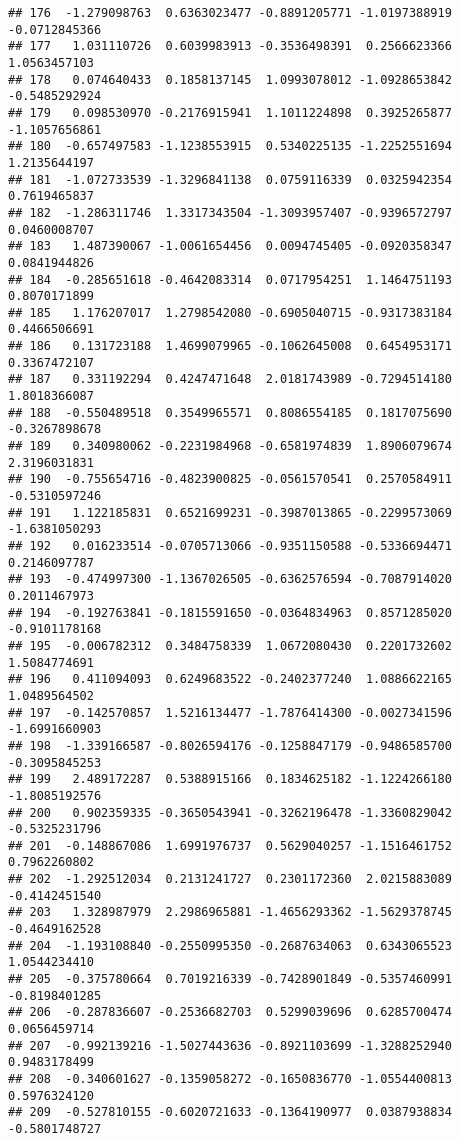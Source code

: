 \documentclass[
]{article}
\begin{document}
\begin{verbatim}
## 176  -1.279098763  0.6363023477 -0.8891205771 -1.0197388919 -0.0712845366
## 177   1.031110726  0.6039983913 -0.3536498391  0.2566623366  1.0563457103
## 178   0.074640433  0.1858137145  1.0993078012 -1.0928653842 -0.5485292924
## 179   0.098530970 -0.2176915941  1.1011224898  0.3925265877 -1.1057656861
## 180  -0.657497583 -1.1238553915  0.5340225135 -1.2252551694  1.2135644197
## 181  -1.072733539 -1.3296841138  0.0759116339  0.0325942354  0.7619465837
## 182  -1.286311746  1.3317343504 -1.3093957407 -0.9396572797  0.0460008707
## 183   1.487390067 -1.0061654456  0.0094745405 -0.0920358347  0.0841944826
## 184  -0.285651618 -0.4642083314  0.0717954251  1.1464751193  0.8070171899
## 185   1.176207017  1.2798542080 -0.6905040715 -0.9317383184  0.4466506691
## 186   0.131723188  1.4699079965 -0.1062645008  0.6454953171  0.3367472107
## 187   0.331192294  0.4247471648  2.0181743989 -0.7294514180  1.8018366087
## 188  -0.550489518  0.3549965571  0.8086554185  0.1817075690 -0.3267898678
## 189   0.340980062 -0.2231984968 -0.6581974839  1.8906079674  2.3196031831
## 190  -0.755654716 -0.4823900825 -0.0561570541  0.2570584911 -0.5310597246
## 191   1.122185831  0.6521699231 -0.3987013865 -0.2299573069 -1.6381050293
## 192   0.016233514 -0.0705713066 -0.9351150588 -0.5336694471  0.2146097787
## 193  -0.474997300 -1.1367026505 -0.6362576594 -0.7087914020  0.2011467973
## 194  -0.192763841 -0.1815591650 -0.0364834963  0.8571285020 -0.9101178168
## 195  -0.006782312  0.3484758339  1.0672080430  0.2201732602  1.5084774691
## 196   0.411094093  0.6249683522 -0.2402377240  1.0886622165  1.0489564502
## 197  -0.142570857  1.5216134477 -1.7876414300 -0.0027341596 -1.6991660903
## 198  -1.339166587 -0.8026594176 -0.1258847179 -0.9486585700 -0.3095845253
## 199   2.489172287  0.5388915166  0.1834625182 -1.1224266180 -1.8085192576
## 200   0.902359335 -0.3650543941 -0.3262196478 -1.3360829042 -0.5325231796
## 201  -0.148867086  1.6991976737  0.5629040257 -1.1516461752  0.7962260802
## 202  -1.292512034  0.2131241727  0.2301172360  2.0215883089 -0.4142451540
## 203   1.328987979  2.2986965881 -1.4656293362 -1.5629378745 -0.4649162528
## 204  -1.193108840 -0.2550995350 -0.2687634063  0.6343065523  1.0544234410
## 205  -0.375780664  0.7019216339 -0.7428901849 -0.5357460991 -0.8198401285
## 206  -0.287836607 -0.2536682703  0.5299039696  0.6285700474  0.0656459714
## 207  -0.992139216 -1.5027443636 -0.8921103699 -1.3288252940  0.9483178499
## 208  -0.340601627 -0.1359058272 -0.1650836770 -1.0554400813  0.5976324120
## 209  -0.527810155 -0.6020721633 -0.1364190977  0.0387938834 -0.5801748727

\end{verbatim}
\end{document}
